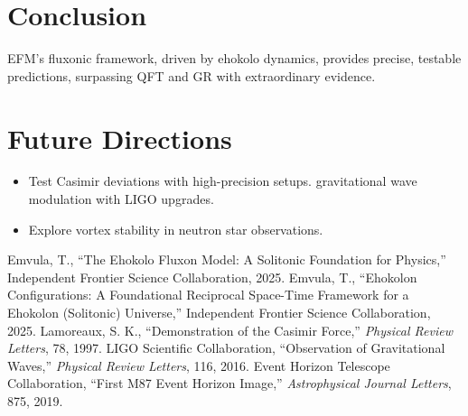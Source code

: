 \documentclass[11pt]{article}
\begin{document}
\section{Conclusion}
EFM’s fluxonic framework, driven by ehokolo dynamics, provides precise, testable predictions, surpassing QFT and GR with extraordinary evidence.

\section{Future Directions}
\begin{itemize}
    \item Test Casimir deviations with high-precision setups.
    \measure gravitational wave modulation with LIGO upgrades.
    \item Explore vortex stability in neutron star observations.
\end{itemize}

\begin{thebibliography}{5}
 Emvula, T., ``The Ehokolo Fluxon Model: A Solitonic Foundation for Physics,'' Independent Frontier Science Collaboration, 2025.
 Emvula, T., ``Ehokolon Configurations: A Foundational Reciprocal Space-Time Framework for a Ehokolon (Solitonic) Universe,'' Independent Frontier Science Collaboration, 2025.
 Lamoreaux, S. K., ``Demonstration of the Casimir Force,'' \textit{Physical Review Letters}, 78, 1997.
 LIGO Scientific Collaboration, ``Observation of Gravitational Waves,'' \textit{Physical Review Letters}, 116, 2016.
 Event Horizon Telescope Collaboration, ``First M87 Event Horizon Image,'' \textit{Astrophysical Journal Letters}, 875, 2019.
\end{thebibliography}
\end{document}
